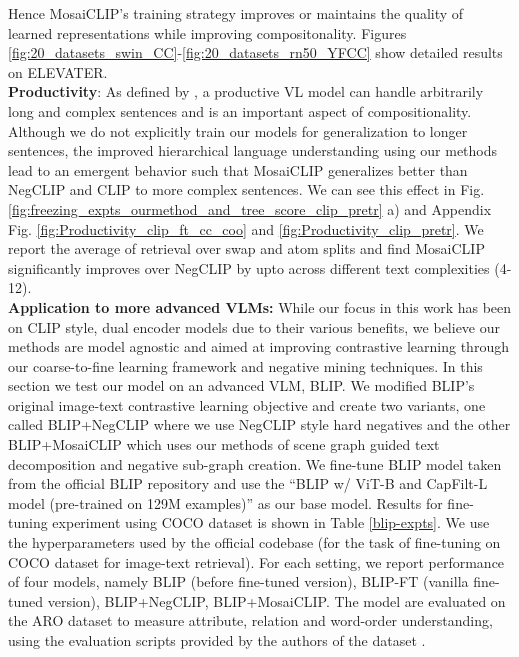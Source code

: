 \documentclass[11pt]{article}
\newcommand{\methodcomp}{MosaiCLIP}
\newcommand{\clip}{CLIP}
\newcommand{\negclip}{NegCLIP}
\begin{document}
Hence \methodcomp{}'s training strategy improves or maintains the quality of learned representations while improving compositonality. Figures \ref{fig:20_datasets_swin_CC}-\ref{fig:20_datasets_rn50_YFCC} show detailed results on ELEVATER.\\
\newline
\noindent \textbf{Productivity}:
As defined by \citet{ma2022crepe}, a productive VL model can handle arbitrarily long and complex sentences and is an important aspect of compositionality. Although we do not explicitly train our models for generalization to longer sentences, the improved hierarchical language understanding using our methods lead to an emergent behavior such that \methodcomp{} generalizes better than \negclip{} and \clip{} to more complex sentences. We can see this effect in Fig. \ref{fig:freezing_expts_ourmethod_and_tree_score_clip_pretr} a) and Appendix Fig. \ref{fig:Productivity_clip_ft_cc_coo} and \ref{fig:Productivity_clip_pretr}. We report the average of retrieval over swap and atom splits and find \methodcomp{} significantly improves over \negclip{} by upto  across different text complexities (4-12). \\
\newline
\noindent \textbf{Application to more advanced VLMs:}
While our focus in this work has been on CLIP style, dual encoder models due to their various benefits, we believe our methods are model agnostic and aimed at improving contrastive learning through our coarse-to-fine learning framework and negative mining techniques. In this section we test our model on an advanced VLM, BLIP.
We modified BLIP’s original image-text contrastive learning objective and create two variants, one called BLIP+NegCLIP where we use NegCLIP style hard negatives and the other BLIP+MosaiCLIP which uses our methods of scene graph guided text decomposition and negative sub-graph creation. We fine-tune BLIP model taken from the official BLIP repository and use the “BLIP w/ ViT-B and CapFilt-L model (pre-trained on 129M examples)” as our base model. Results for fine-tuning experiment using COCO dataset is shown in Table \ref{blip-expts}. We use the hyperparameters used by the official codebase (for the task of fine-tuning on COCO dataset for image-text retrieval). For each setting, we report performance of four models, namely BLIP (before fine-tuned version), BLIP-FT (vanilla fine-tuned version), BLIP+NegCLIP, BLIP+MosaiCLIP. The model are evaluated on the ARO dataset to measure attribute, relation and word-order understanding, using the evaluation scripts provided by the authors of the dataset \citep{yuksekgonul2022and}.
\end{document}
